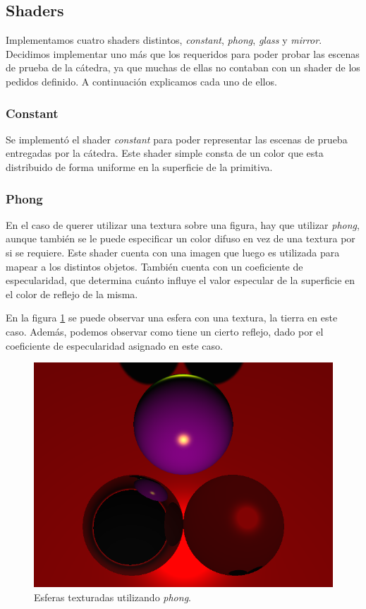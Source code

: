 \documentclass[a4paper,10pt]{article}
\begin{document}
\subsection{Shaders}

Implementamos cuatro shaders distintos, \emph{constant}, \emph{phong},
\emph{glass} y \emph{mirror}.  Decidimos implementar uno m\'as que los
requeridos para poder probar las escenas de prueba de la c\'atedra, ya que
muchas de ellas no contaban con un shader de los pedidos definido.  A
continuaci\'on explicamos cada uno de ellos.

\subsubsection{Constant}
Se implement\'o el shader \emph{constant} para poder representar las escenas de
prueba entregadas por la c\'atedra. Este shader simple consta de un color que
esta distribuido de forma uniforme en la superficie de la primitiva.

\subsubsection{Phong}
En el caso de querer utilizar una textura sobre una figura, hay que utilizar
\emph{phong}, aunque tambi\'en se le puede especificar un color difuso en 
vez de una textura por si se requiere. Este shader cuenta con una imagen
que luego es utilizada para mapear a los distintos objetos.
Tambi\'en cuenta con un coeficiente de especularidad, que determina cu\'anto
influye el valor especular de la superficie en el color de reflejo de la misma.

En la figura \ref{fig:figure11} se puede observar una esfera con una textura,
la tierra en este caso.  Adem\'as, podemos observar como tiene un cierto
reflejo, dado por el coeficiente de especularidad asignado en este caso.

\begin{figure}[ht]
\centering
\includegraphics[scale=0.50]{earth.png}
\caption{Esferas texturadas utilizando \emph{phong}.}
\label{fig:figure11}
\end{figure}
\end{document}
